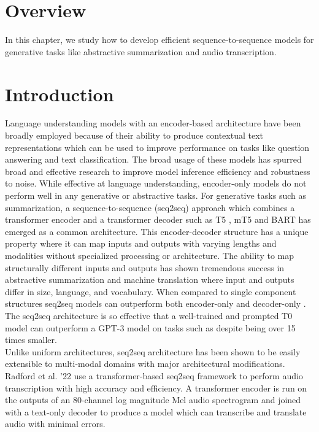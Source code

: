 \section{Overview}
In this chapter, we study how to develop efficient sequence-to-sequence models for generative tasks like abstractive summarization and audio transcription. 
\section{Introduction}
Language understanding models with an encoder-based architecture have been broadly employed because of their ability to produce contextual text representations which can be used to improve performance on tasks like question answering and text classification. The broad usage of these models has spurred broad and effective research to improve model inference efficiency and robustness to noise. While effective at language understanding, encoder-only models do not perform well in any generative or abstractive tasks. For generative tasks such as summarization, a sequence-to-sequence (seq2seq) approach which combines a transformer encoder and a transformer decoder such as T5 \cite{Raffel2020ExploringTL}, mT5 \cite{Xue2021mT5AM} and BART \cite{Lewis2020BARTDS} has emerged as a common architecture. This encoder-decoder structure has a unique property where it can map inputs and outputs with varying lengths and modalities without specialized processing or architecture. The ability to map structurally different inputs and outputs has shown tremendous success in abstractive summarization and machine translation where input and outputs differ in size, language, and vocabulary. When compared to single component structures seq2seq models can outperform both encoder-only \cite{Zhuang2022RankT5FT} and decoder-only \cite{Sanh2022MultitaskPT}. The seq2seq architecture is so effective that a well-trained and prompted T0 model can outperform a GPT-3 model on tasks such as  \cite{Sanh2022MultitaskPT} despite being over 15 times smaller. \\
Unlike uniform architectures, seq2seq architecture has been shown to be easily extensible to multi-modal domains with major architectural modifications. Radford et al. '22 \cite{Radford2022RobustSR} use a transformer-based seq2seq framework to perform audio transcription with high accuracy and efficiency. A transformer encoder is run on the outputs of an 80-channel log magnitude Mel audio spectrogram and joined with a text-only decoder to produce a model which can transcribe and translate audio with minimal errors. \\
